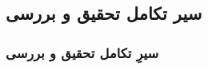 \label{evolution_of_study}

\subsection{سیر تکامل تحقیق و بررسی}
\begin{frame}
\frametitle{سیرِ تکامل تحقیق و بررسی}

\end{frame}
